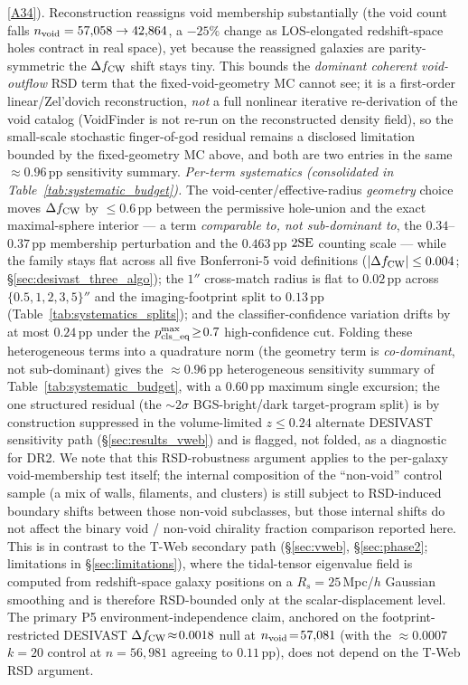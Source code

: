 \documentclass[twocolumn,linenumbers]{aastex702}
\newcommand{\repoBase}{https://github.com/Hubify-Projects/bigbounce/blob/main}
\begin{document}
\href{\repoBase/pipelines/p5\_desi\_chirality/scripts/27\_rsd\_void\_recon\_bound.py}{[A34]}).
Reconstruction reassigns void membership substantially (the void count
falls $n_{\rm void}=57{,}058\to42{,}864$, a ${-}25\%$ change as
LOS-elongated redshift-space holes contract in real space), yet because
the reassigned galaxies are parity-symmetric the $\Delta f_{\rm CW}$
shift stays tiny.
This bounds the \emph{dominant coherent void-outflow} RSD term that the
fixed-void-geometry MC cannot see; it is a first-order linear/Zel'dovich
reconstruction, \emph{not} a full nonlinear iterative re-derivation of
the void catalog (VoidFinder is not re-run on the reconstructed density
field), so the small-scale stochastic finger-of-god residual remains a
disclosed limitation bounded by the fixed-geometry MC above, and both
are two entries in the same ${\approx}0.96$\,pp sensitivity summary.
\emph{Per-term systematics (consolidated in
Table~\ref{tab:systematic_budget}).} The void-center/effective-radius
\emph{geometry} choice moves $\Delta f_{\rm CW}$ by $\le 0.6$\,pp between
the permissive hole-union and the exact maximal-sphere interior --- a
term \emph{comparable to, not sub-dominant to}, the
$0.34$--$0.37$\,pp membership perturbation and the $0.463$\,pp $2{\rm SE}$ counting scale
--- while the family stays flat across all five Bonferroni-5 void
definitions ($|\Delta f_{\rm CW}| \le 0.004$;
\S\ref{sec:desivast_three_algo}); the $1''$ cross-match radius is flat to
$0.02$\,pp across $\{0.5,1,2,3,5\}''$ and the imaging-footprint split to
$0.13$\,pp (Table~\ref{tab:systematics_splits}); and the
classifier-confidence variation drifts by at most $0.24$\,pp under the
$p_{\rm cls\_eq}^{\max}\!\ge\!0.7$ high-confidence cut. Folding these
heterogeneous terms into a quadrature norm (the geometry term is
\emph{co-dominant}, not sub-dominant) gives the ${\approx}0.96$\,pp
heterogeneous sensitivity summary of Table~\ref{tab:systematic_budget}, with a
$0.60$\,pp maximum single excursion; the one
structured residual (the ${\sim}2\sigma$ BGS-bright/dark target-program
split) is by construction suppressed in the volume-limited $z\!\le\!0.24$
alternate DESIVAST sensitivity path (\S\ref{sec:results_vweb}) and is flagged, not folded,
as a diagnostic for DR2. We note that
this RSD-robustness argument applies to the per-galaxy void-membership
test itself; the internal composition of the ``non-void'' control
sample (a mix of walls, filaments, and clusters) is still subject to
RSD-induced boundary shifts between those non-void subclasses, but
those internal shifts do not affect the binary void / non-void
chirality fraction comparison reported here. This is in contrast to the T-Web secondary
path (\S\ref{sec:vweb}, \S\ref{sec:phase2}; limitations in
\S\ref{sec:limitations}), where the tidal-tensor eigenvalue
field is computed from redshift-space galaxy positions on a
$R_s\!=\!25$\,Mpc/$h$ Gaussian smoothing and is therefore
RSD-bounded only at the scalar-displacement level. The primary
P5 environment-independence claim, anchored on the footprint-restricted
DESIVAST $\Delta f_{\rm CW}\!\approx\!0.0018$ null at
$n_{\rm void}\!=\!57{,}081$ (with the $\approx\!0.0007$ $k\!=\!20$
control at $n\!=\!56{,}981$ agreeing to $0.11$\,pp), does not depend on
the T-Web RSD argument.
\end{document}
